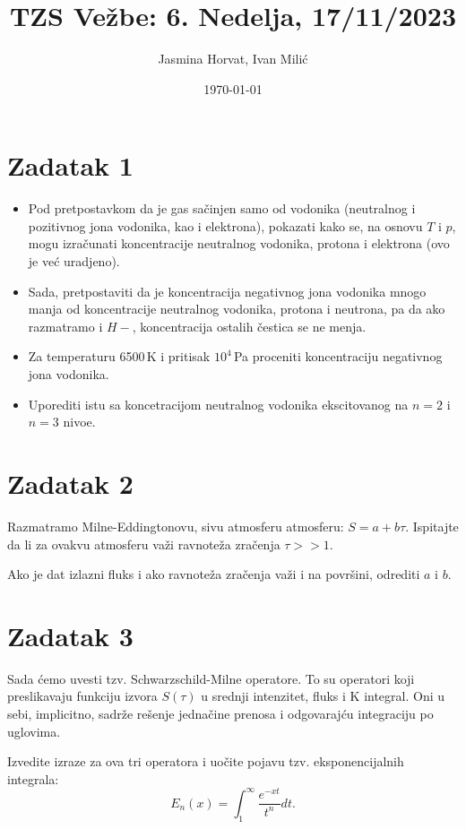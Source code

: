 \documentclass[12pt]{article}
\title{TZS Ve\v{z}be: 6. Nedelja, 17/11/2023}
\author{Jasmina Horvat, Ivan Mili\'{c}}
\date{\today}
\begin{document}
\maketitle

\section{Zadatak 1}
\begin{itemize}
    \item Pod pretpostavkom da je gas sa\v{c}injen samo od vodonika (neutralnog i pozitivnog jona vodonika, kao i elektrona), pokazati kako se, na osnovu $T$ i $p$, mogu izra\v{c}unati koncentracije neutralnog vodonika, protona i elektrona (ovo je ve\'{c} uradjeno).
    \item Sada, pretpostaviti da je koncentracija negativnog jona vodonika mnogo manja od koncentracije neutralnog vodonika, protona i neutrona, pa da ako razmatramo i $H-$, koncentracija ostalih \v{c}estica se ne menja. 
    \item Za temperaturu 6500\,K i pritisak $10^4$\,Pa proceniti koncentraciju negativnog jona vodonika. 
    \item Uporediti istu sa koncetracijom neutralnog vodonika ekscitovanog na $n=2$ i $n=3$ nivoe. 
\end{itemize}

\section{Zadatak 2}
Razmatramo Milne-Eddingtonovu, sivu atmosferu atmosferu: $S=a+b\tau$. Ispitajte da li za ovakvu atmosferu va\v{z}i ravnote\v{z}a zra\v{c}enja $\tau >> 1$. 

Ako je dat izlazni fluks i ako ravnote\v{z}a zra\v{c}enja va\v{z}i i na povr\v{s}ini, odrediti $a$ i $b$.

\section{Zadatak 3}
Sada \'{c}emo uvesti tzv. Schwarzschild-Milne operatore. To su operatori koji preslikavaju funkciju izvora $S(\tau)$ u srednji intenzitet, fluks i K integral. Oni u sebi, implicitno, sadr\v{z}e re\v{s}enje jedna\v{c}ine prenosa i odgovaraj\'{c}u integraciju po uglovima. 

Izvedite izraze za ova tri operatora i uo\v{c}ite pojavu tzv. eksponencijalnih integrala:
\begin{equation}
E_n(x) = \int_1^{\infty} \frac{e^{-xt}}{t^n} dt.
\end{equation}
\end{document}
